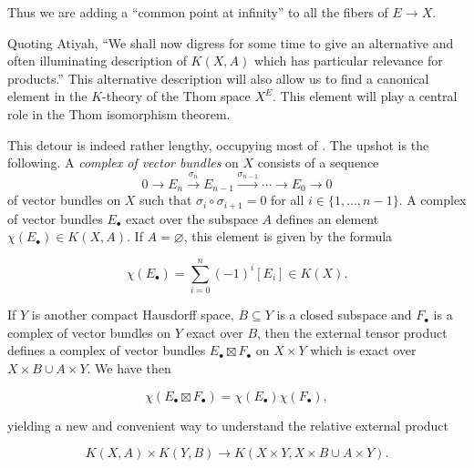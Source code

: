 \documentclass[12pt,a4paper]{amsart}
\theoremstyle{plain}
\theoremstyle{definition}
\theoremstyle{remark}
\begin{document}
Thus we are adding a ``common point at infinity'' to all the fibers of $E \to X$.

Quoting Atiyah, ``We shall now digress for some time to give an alternative and often illuminating description of $K(X,A)$ which has particular relevance for products.''
This alternative description will also allow us to find a canonical element in the $K$-theory of the Thom space $X^{E}$.
This element will play a central role in the Thom isomorphism theorem.

This detour is indeed rather lengthy, occupying most of \cite[\S 2.6]{ati67}.
The upshot is the following.
A \textit{complex of vector bundles} on $X$ consists of a sequence
\[ 0 \to E_{n} \xrightarrow{\sigma_{n}} E_{n-1} \xrightarrow{\sigma_{n-1}} \cdots \to E_{0} \to 0 \]
of vector bundles on $X$ such that $\sigma_{i} \circ \sigma_{i+1} = 0$ for all $i \in \{1, \dots, n-1\}$.
A complex of vector bundles $E_{\bullet}$ exact over the subspace $A$ defines an element $\chi (E_{\bullet}) \in K(X,A)$.
If $A = \varnothing$, this element is given by the formula

\[ \chi(E_{\bullet}) = \sum_{i = 0}^{n} (-1)^{i}[E_{i}] \in K(X). \]

If $Y$ is another compact Hausdorff space, $B \subseteq Y$ is a closed subspace and $F_{\bullet}$ is a complex of vector bundles on $Y$ exact over $B$, then the external tensor product defines a complex of vector bundles $E_{\bullet} \boxtimes F_{\bullet}$ on $X \times Y$ which is exact over $X \times B \cup A \times Y$.
We have then

\[ \chi( E_{\bullet} \boxtimes F_{\bullet}) = \chi(E_{\bullet}) \chi(F_{\bullet}), \]

yielding a new and convenient way to understand the relative external product

\[ K(X,A) \times K(Y,B) \to K(X \times Y, X \times B \cup A \times Y). \]
\end{document}
